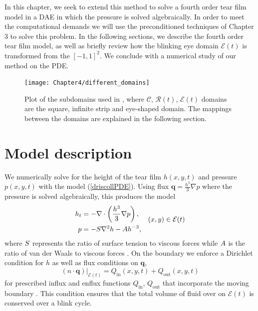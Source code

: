 In this chapter, we seek to extend this method to solve a fourth order tear film model in a DAE in which the pressure is solved algebraically. In order to meet the computational demands we will use the preconditioned techniques of Chapter 3 to solve this problem. In the following sections, we describe the fourth order tear film model, as well as briefly review how the blinking eye domain $\mathcal{E}(t)$ is transformed from the $[-1,1]^2$. We conclude with a numerical study of our method on the PDE.


\begin{figure}
  \centering
  \texttt{[image: Chapter4/different\_domains]}
  \caption{Plot of the subdomains used in \cite{driscoll2018simulation}, where $\mathcal{C}$, $\mathcal{R}(t)$, $\mathcal{E}(t)$ domains are the square, infinite strip and eye-shaped domain. The mappings between the domains are explained in the following section.}
  \label{driscoll_eye}
\end{figure}
	
\section{Model description}

We numerically solve for the height of the tear film $h(x,y,t)$ and pressure $p(x,y,t)$ with the model (\ref{driscollPDE}). Using flux $\bm{q} =  \frac{h^3}{3} \nabla p$ where the pressure is solved algebraically, this produces the model
\begin{align}
\begin{aligned}
h_t &= - \nabla \cdot \left( \frac{h^3}{3} \nabla p \right), \\
p &= - S \nabla^2 h - A h^{-3},
\end{aligned} \quad (x,y) \in \mathcal{E}(t)
\label{the_pde}
\end{align}
where $S$ represents the ratio of surface tension to viscous forces while $A$ is the ratio of van der Waals to viscous forces \cite{braun2015dynamics}. On the boundary we enforce a Dirichlet condition for $h$ as well as flux conditions on $\bm{q}$,
\begin{equation}
\label{normal_conds}
(n \cdot \bm{q})\vert_{\mathcal{E}(t)} = Q_{\text{in}}(x,y,t)+Q_{\text{out}}(x,y,t)
\end{equation}
for prescribed influx and enflux functions $Q_{\text{in}}$, $Q_{\text{out}}$ that incorporate the moving boundary  \cite{li2015computed,heryudono2007single,braun2015dynamics}.
This condition ensures that the total volume of fluid over on $\mathcal{E}(t)$ is conserved over a blink cycle.

